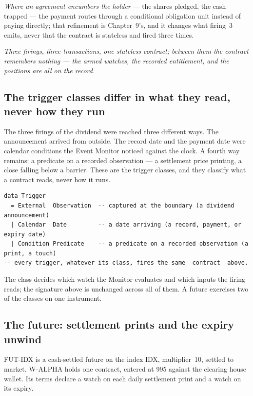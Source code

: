 \emph{Where an agreement encumbers the holder} --- the shares pledged, the cash
trapped --- the payment routes through a conditional obligation unit instead of
paying directly; that refinement is Chapter~9's, and it changes what firing~3
emits, never that the contract is stateless and fired three times.

\emph{Three firings, three transactions, one stateless contract; between them
the contract remembers nothing --- the armed watches, the recorded entitlement,
and the positions are all on the record.}

\subsection{The trigger classes differ in what they read, never how they run}

The three firings of the dividend were reached three different ways. The
announcement arrived from outside. The record date and the payment date were
calendar conditions the Event Monitor noticed against the clock. A fourth way
remains: a predicate on a recorded observation --- a settlement price printing,
a close falling below a barrier. These are the trigger classes, and they
classify what a contract reads, never how it runs.

\begin{lstlisting}
data Trigger
  = External  Observation  -- captured at the boundary (a dividend announcement)
  | Calendar  Date         -- a date arriving (a record, payment, or expiry date)
  | Condition Predicate    -- a predicate on a recorded observation (a print, a touch)
-- every trigger, whatever its class, fires the same  contract  above.
\end{lstlisting}

The class decides which watch the Monitor evaluates and which inputs the firing
reads; the signature above is unchanged across all of them. A future exercises
two of the classes on one instrument.

\subsection{The future: settlement prints and the expiry unwind}

FUT-IDX is a cash-settled future on the index IDX, multiplier~10, settled to
market. W-ALPHA holds one contract, entered at 995 against the clearing house
wallet. Its terms declare a watch on each daily settlement print and a watch on
its expiry.

